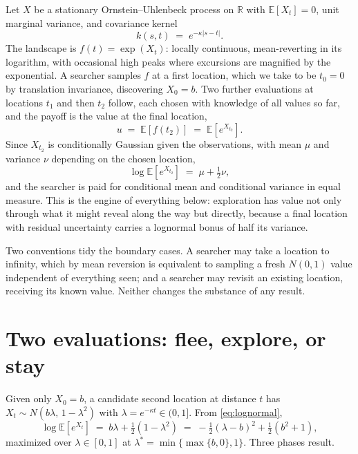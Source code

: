 \documentclass[11pt]{article}
\theoremstyle{itheads}
\newcommand{\E}{\mathbb{E}}
\newcommand{\R}{\mathbb{R}}
\begin{document}
Let $X$ be a stationary Ornstein--Uhlenbeck process on $\R$ with
$\E[X_t]=0$, unit marginal variance, and covariance kernel
\begin{equation}
k(s,t) \;=\; e^{-\kappa|s-t|}.
\end{equation}
The landscape is $f(t)=\exp(X_t)$: locally continuous, mean-reverting in
its logarithm, with occasional high peaks where excursions are magnified
by the exponential. A searcher samples $f$ at a first location, which we
take to be $t_0=0$ by translation invariance, discovering $X_0=b$. Two
further evaluations at locations $t_1$ and then $t_2$ follow, each chosen
with knowledge of all values so far, and the payoff is the value at the
final location,
\begin{equation}
u \;=\; \E\!\left[f(t_2)\right]
\;=\; \E\!\left[e^{X_{t_2}}\right].
\end{equation}
Since $X_{t_2}$ is conditionally Gaussian given the observations, with
mean $\mu$ and variance $\nu$ depending on the chosen location,
\begin{equation}\label{eq:lognormal}
\log \E\!\left[e^{X_{t_2}}\right] \;=\; \mu + \tfrac{1}{2}\nu ,
\end{equation}
and the searcher is paid for conditional mean and conditional variance in
equal measure. This is the engine of everything below: exploration has
value not only through what it might reveal along the way but directly,
because a final location with residual uncertainty carries a lognormal
bonus of half its variance.

Two conventions tidy the boundary cases. A searcher may take a location
to infinity, which by mean reversion is equivalent to sampling a fresh
$N(0,1)$ value independent of everything seen; and a searcher may revisit
an existing location, receiving its known value. Neither changes the
substance of any result.

\section{Two evaluations: flee, explore, or stay}

Given only $X_0=b$, a candidate second location at distance $t$ has
$X_t \sim N\!\left(b\lambda,\,1-\lambda^{2}\right)$ with
$\lambda=e^{-\kappa t}\in(0,1]$. From \eqref{eq:lognormal},
\begin{equation}
\log \E\!\left[e^{X_t}\right]
\;=\; b\lambda + \tfrac{1}{2}\!\left(1-\lambda^{2}\right)
\;=\; -\tfrac{1}{2}\left(\lambda-b\right)^{2} + \tfrac{1}{2}\left(b^{2}+1\right),
\end{equation}
maximized over $\lambda\in[0,1]$ at $\lambda^{*}=\min\{\max\{b,0\},1\}$.
Three phases result.
\end{document}
